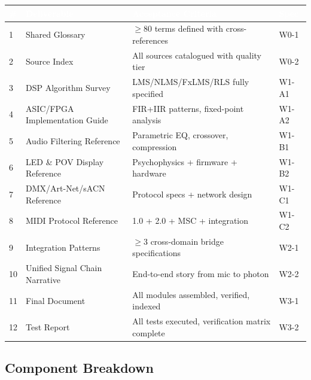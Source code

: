 \documentclass[11pt,letterpaper]{article}
\newcommand{\tableheader}[1]{\textbf{\sffamily\textcolor{white}{#1}}}
\begin{document}
\begin{center}
\begin{tabularx}{\textwidth}{C{0.6cm}L{3.5cm}XC{1.8cm}}
\toprule
{}
\tableheader{\#} & \tableheader{Deliverable} & \tableheader{Acceptance Criteria} & \tableheader{Spec} \\
 & Shared Glossary & $\geq$80 terms defined with cross-references & W0-1 \\
2 & Source Index & All sources catalogued with quality tier & W0-2 \\
3 & DSP Algorithm Survey & LMS/NLMS/FxLMS/RLS fully specified & W1-A1 \\
4 & ASIC/FPGA Implementation Guide & FIR+IIR patterns, fixed-point analysis & W1-A2 \\
5 & Audio Filtering Reference & Parametric EQ, crossover, compression & W1-B1 \\
6 & LED \& POV Display Reference & Psychophysics + firmware + hardware & W1-B2 \\
7 & DMX/Art-Net/sACN Reference & Protocol specs + network design & W1-C1 \\
8 & MIDI Protocol Reference & 1.0 + 2.0 + MSC + integration & W1-C2 \\
9 & Integration Patterns & $\geq$3 cross-domain bridge specifications & W2-1 \\
10 & Unified Signal Chain Narrative & End-to-end story from mic to photon & W2-2 \\
11 & Final Document & All modules assembled, verified, indexed & W3-1 \\
12 & Test Report & All tests executed, verification matrix complete & W3-2 \\
\bottomrule
\end{tabularx}
\end{center}

\subsection{Component Breakdown}
\end{document}
